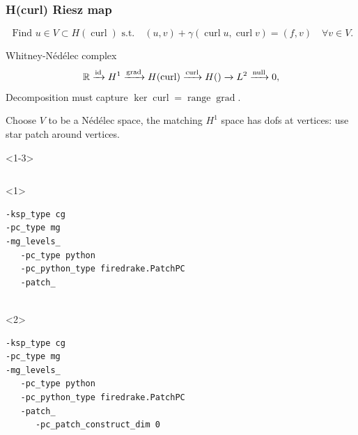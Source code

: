 \documentclass[presentation,aspectratio=43, 10pt]{beamer}
\DeclareMathOperator{\grad}{grad}
\let\div\relax
\DeclareMathOperator{\div}{div}
\DeclareMathOperator{\curl}{curl}
\DeclareMathOperator{\range}{range}
\begin{document}
\begin{frame}[fragile,t]
  \frametitle{H(curl) Riesz map}
  \vspace{-1.5\baselineskip}
  \begin{equation*}
    \text{  Find $u \in V \subset H(\curl)$ s.t.} \quad (u, v) + \gamma (\curl u, \curl v) = (f, v) \quad \forall v \in V.
  \end{equation*}
  \vspace{-\baselineskip}
  \begin{block}{Whitney-N\'ed\'elec complex}
    \begin{equation*}
      \mathbb{R} \xrightarrow{\operatorname{id}} H^1 \xrightarrow{\grad} H(\curl)
      \xrightarrow{\curl} H(\div) \xrightarrow{\div} L^2 \xrightarrow{\operatorname{null}} 0,
    \end{equation*}
    Decomposition must capture $\ker \curl = \range \grad$.

    Choose $V$ to be a N\'ed\'elec space, the matching $H^1$
    space has dofs at vertices: use star patch around vertices.
  \end{block}
  \begin{overlayarea}{\textwidth}{0.5\textheight}
  \begin{onlyenv}<1-3>
    \begin{columns}[T]
      \begin{column}{0.6\textwidth}
        \begin{onlyenv}<1>
\begin{verbatim}
-ksp_type cg
-pc_type mg
-mg_levels_
   -pc_type python
   -pc_python_type firedrake.PatchPC
   -patch_


\end{verbatim}
        \end{onlyenv}
        \begin{onlyenv}<2>
\begin{verbatim}
-ksp_type cg
-pc_type mg
-mg_levels_
   -pc_type python
   -pc_python_type firedrake.PatchPC
   -patch_
      -pc_patch_construct_dim 0


\end{verbatim}
\end{onlyenv}
\end{column}
\end{columns}
\end{onlyenv}
\end{overlayarea}
\end{frame}
\end{document}
